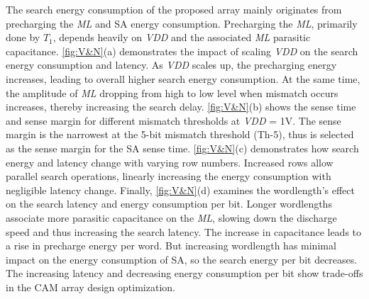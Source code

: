 The search energy consumption of the proposed array mainly originates from precharging the \textit{ML} and SA energy consumption.
Precharging the \textit{ML}, primarily done by $\textit{T}_\text{1}$, depends heavily on \textit{VDD} and the associated \textit{ML} parasitic capacitance.
\autoref{fig:V&N}(a) demonstrates the impact of scaling \textit{VDD} on the search energy consumption and latency. 
As \textit{VDD} scales up, the precharging energy increases, leading to overall higher search energy consumption. At the same time, the amplitude of \textit{ML} dropping from high to low level when mismatch occurs increases, thereby increasing the search delay.  
\autoref{fig:V&N}(b) shows the sense time and sense margin for different mismatch thresholds at \textit{VDD} = 1V. The sense margin is the narrowest at the 5-bit mismatch threshold (Th-5), thus is selected as the sense margin for the SA sense time. 
\autoref{fig:V&N}(c) demonstrates how search energy and latency change with varying row numbers. Increased rows allow parallel search operations, linearly increasing the energy consumption with negligible latency change. 
Finally, \autoref{fig:V&N}(d) examines the wordlength's effect on the search latency and energy consumption per bit. 
Longer wordlengths associate more parasitic capacitance on the \textit{ML}, slowing down the discharge speed and thus increasing the search latency. The increase in capacitance 
leads to a rise in precharge energy per word. But increasing wordlength has minimal impact on the energy consumption of SA, so the search energy per bit decreases. The increasing latency and decreasing energy consumption per bit show trade-offs in the CAM array design optimization.




